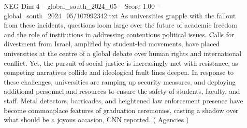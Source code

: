 \begin{textsample}{NEG Dim 4 – global\_south\_2024\_05 – Score 1.00 – global\_south\_2024\_05/107992342.txt}
As universities grapple with the fallout from these incidents, questions loom large over the future of academic freedom and the role of institutions in addressing contentious political issues.
Calls for divestment from Israel, amplified by student-led movements, have placed universities at the centre of a global debate over human rights and international conflict.
Yet, the pursuit of social justice is increasingly met with resistance, as competing narratives collide and ideological fault lines deepen.
In response to these challenges, universities are ramping up security measures, and deploying additional personnel and resources to ensure the safety of students, faculty, and staff.
Metal detectors, barricades, and heightened law enforcement presence have become commonplace features of graduation ceremonies, casting a shadow over what should be a joyous occasion, CNN reported. ( Agencies )

\end{textsample}
